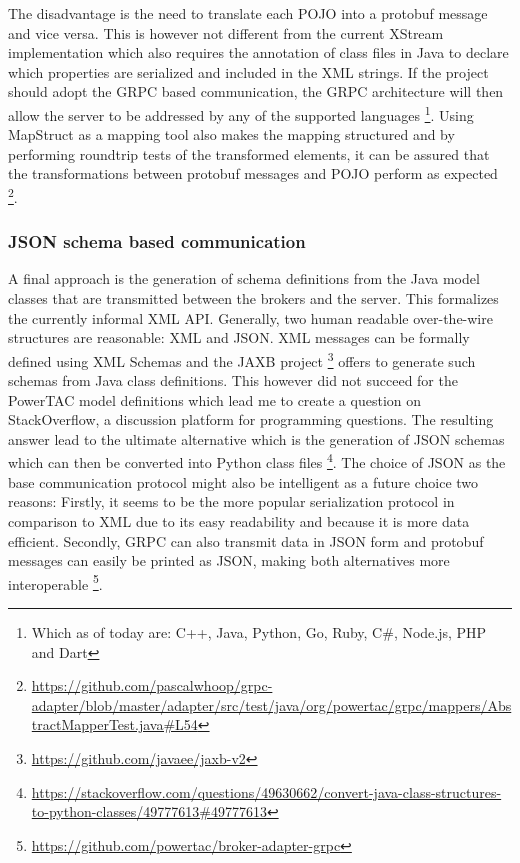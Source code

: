 The disadvantage is the need to translate each \ac{POJO} into a protobuf message and
vice versa. This is however not different from the current XStream implementation which also requires the annotation of
class files in Java to declare which properties are serialized and included in the \ac{XML} strings. If the project
should adopt the \ac{GRPC} based communication, the \ac{GRPC} architecture will then allow the server to be addressed by
any of the supported languages \footnote{Which as of today are: C++, Java, Python, Go, Ruby, C\#, Node.js, PHP and
Dart}. Using MapStruct as a mapping tool also makes the mapping structured and by performing roundtrip tests of the
transformed elements, it can be assured that the transformations between protobuf messages and \ac{POJO} perform as expected
\footnote{\url{https://github.com/pascalwhoop/grpc-adapter/blob/master/adapter/src/test/java/org/powertac/grpc/mappers/AbstractMapperTest.java#L54}}.



\subsubsection{JSON schema based communication}%
\label{sub:json_schema_based_communication}


A final approach is the generation of schema definitions from the Java model classes that are transmitted between the
brokers and the server. This formalizes the currently informal \ac{XML} \ac{API}. Generally, two human readable over-the-wire structures are reasonable: \ac{XML} and \ac{JSON}.
\ac{XML} messages can be formally defined using \ac{XML} Schemas and the \ac{JAXB} project
\footnote{\url{https://github.com/javaee/jaxb-v2}} offers to generate such schemas from Java class definitions. This
however did not succeed for the \ac{PowerTAC} model definitions which lead me to create a question on StackOverflow, a
discussion platform for programming questions. The resulting answer lead to the ultimate alternative which is the
generation of \ac{JSON} schemas which can then be converted into Python class files
\footnote{\url{https://stackoverflow.com/questions/49630662/convert-java-class-structures-to-python-classes/49777613\#49777613}}.
The choice of \ac{JSON} as the base communication protocol might also be intelligent as a future choice two reasons:
Firstly, it seems to be the more popular serialization protocol in comparison to \ac{XML} \citep{jsonxml} due to its
easy readability and because it is more data efficient. Secondly, \ac{GRPC} can also transmit data in \ac{JSON} form
and protobuf messages can easily be printed as \ac{JSON}, making both alternatives more interoperable
\footnote{\url{https://github.com/powertac/broker-adapter-grpc} }.

